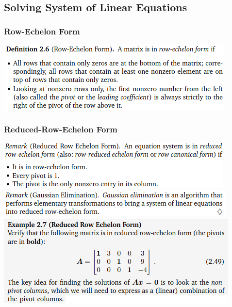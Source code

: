 \documentclass[oneside,10pt]{scrartcl}
\begin{document}
\begin{multicols*}{2}
\subsection{Solving System of Linear Equations}
\subsubsection*{Row-Echelon Form}
\includegraphics[width=\linewidth]{2.3}

\subsubsection*{Reduced-Row-Echelon Form}
\includegraphics[width=\linewidth]{2.3_1}
\includegraphics[width=\linewidth]{2.3_2}
\includegraphics[width=\linewidth]{2.3_5}


\end{multicols*}
\end{document}
